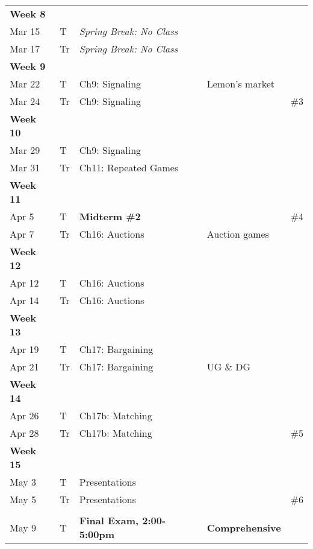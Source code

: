 \documentclass[11pt,letter]{article}
\begin{document}
\begin{small}
{\begin{tabular}{ L{2.2cm}L{1.4cm}L{6.6cm}L{5.4cm}C{3.1cm}}
\textbf{Week 8}   \\
Mar 15 &   T    &  \textit{Spring Break: No Class}     & &       \\
Mar 17   &   Tr    &  \textit{Spring Break: No Class}     & &       \\
\textbf{Week 9}   \\
Mar 22 &   T   &  Ch9: Signaling  & Lemon's market &       \\
Mar 24   &   Tr    &  Ch9: Signaling   &  &  \#3  \\
\textbf{Week 10}   \\
Mar 29 &   T    &  Ch9: Signaling   &     &       \\
Mar 31   &   Tr    &  Ch11: Repeated Games   &   &    \\
\textbf{Week 11}   \\
Apr 5 &   T    &  \textbf{Midterm \#2}  &  & \#4   \\
Apr 7  &   Tr    & Ch16: Auctions  & Auction games &    \\
\textbf{Week 12}   \\
Apr 12 &   T    &  Ch16: Auctions  &   &    \\
Apr 14   &   Tr   & Ch16: Auctions  &   &   \\
\textbf{Week 13}   \\
Apr 19 &   T    &  Ch17: Bargaining  &   &  \\
Apr 21   &   Tr     &  Ch17: Bargaining & UG \& DG &    \\
\textbf{Week 14}   \\
Apr 26 &   T    & Ch17b: Matching &  &    \\
Apr 28   &   Tr    &  Ch17b: Matching &       &  \#5  \\
\textbf{Week 15}   \\
May 3 &   T    & Presentations &    &    \\
May 5   &   Tr    & Presentations &      &  \#6  \\
& \\
May 9    &   T    &  \textbf{Final Exam, 2:00-5:00pm} & \textbf{Comprehensive}  & &  \\

\bottomrule
\end{tabular}}

\end{small}

\fi
\end{document}
